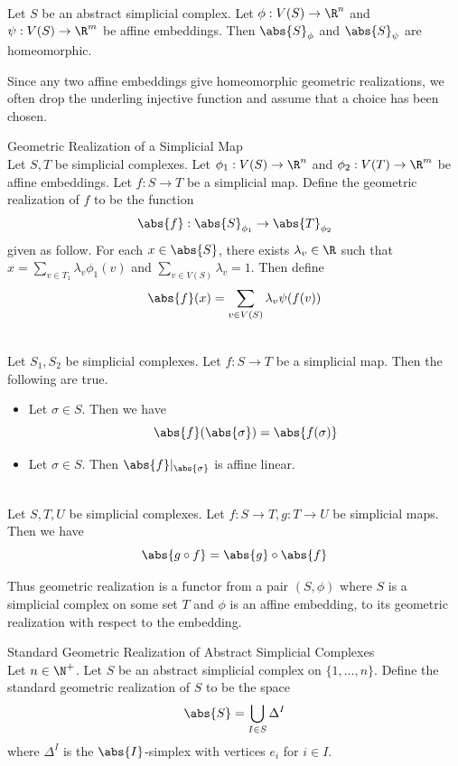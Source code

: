 \documentclass[a4paper]{article}
\begin{document}
\begin{prp}{}{}\\
Let $S$ be an abstract simplicial complex. Let $\phi:V(S)\to\R^n$ and $\psi:V(S)\to\R^m$ be affine embeddings. Then $\abs{S}_\phi$ and $\abs{S}_\psi$ are homeomorphic. 
\end{prp}

Since any two affine embeddings give homeomorphic geometric realizations, we often drop the underling injective function and assume that a choice has been chosen. 

\begin{defn}{Geometric Realization of a Simplicial Map}{}\\
Let $S,T$ be simplicial complexes. Let $\phi_1:V(S)\to\R^n$ and $\phi_2:V(T)\to\R^m$ be affine embeddings. Let $f:S\to T$ be a simplicial map. Define the geometric realization of $f$ to be the function $$\abs{f}:\abs{S}_{\phi_1}\to\abs{T}_{\phi_2}$$ given as follow. For each $x\in\abs{S}$, there exists $\lambda_v\in\R$ such that $x=\sum_{v\in T_1}\lambda_v\phi_1(v)$ and $\sum_{v\in V(S)}\lambda_v=1$. Then define $$\abs{f}(x)=\sum_{v\in V(S)}\lambda_v\psi(f(v))$$
\end{defn}

\begin{prp}{}{}\\
Let $S_1,S_2$ be simplicial complexes. Let $f:S\to T$ be a simplicial map. Then the following are true. 
\begin{itemize}
\item Let $\sigma\in S$. Then we have $$\abs{f}(\abs{\sigma})=\abs{f(\sigma)}$$
\item Let $\sigma\in S$. Then $\abs{f}|_{\abs{\sigma}}$ is affine linear. 
\end{itemize}
\end{prp}

\begin{lmm}{}{}\\
Let $S,T,U$ be simplicial complexes. Let $f:S\to T,g:T\to U$ be simplicial maps. Then we have $$\abs{g\circ f}=\abs{g}\circ\abs{f}$$
\end{lmm}

Thus geometric realization is a functor from a pair $(S,\phi)$ where $S$ is a simplicial complex on some set $T$ and $\phi$ is an affine embedding, to its geometric realization with respect to the embedding. 

\begin{defn}{Standard Geometric Realization of Abstract Simplicial Complexes}{}\\
Let $n\in\N^+$. Let $S$ be an abstract simplicial complex on $\{1,\dots,n\}$. Define the standard geometric realization of $S$ to be the space $$\abs{S}=\bigcup_{I\in S}\Delta^I$$ where $\Delta^I$ is the $\abs{I}$-simplex with vertices $e_i$ for $i\in I$. 
\end{defn}
\end{document}
